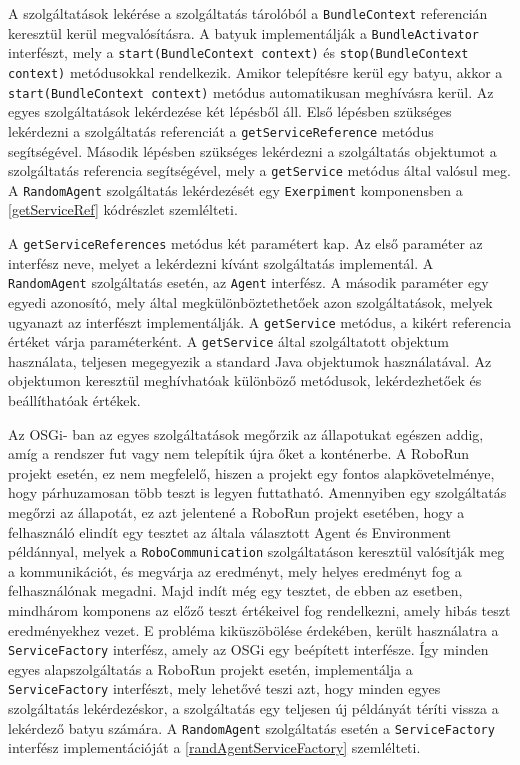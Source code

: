 A szolgáltatások lekérése a szolgáltatás tárolóból a \texttt{BundleContext} referencián keresztül kerül megvalósításra. A batyuk implementálják a \texttt{BundleActivator} interfészt, mely a \texttt{start(BundleContext context)} és \texttt{stop(BundleContext context)} metódusokkal rendelkezik. Amikor telepítésre kerül egy batyu, akkor a \texttt{start(BundleContext context)} metódus automatikusan meghívásra kerül. Az egyes szolgáltatások lekérdezése két lépésből áll. Első lépésben szükséges lekérdezni a szolgáltatás referenciát a \texttt{getServiceReference} metódus segítségével. Második lépésben szükséges lekérdezni a szolgáltatás objektumot a szolgáltatás referencia segítségével, mely a \texttt{getService} metódus által valósul meg. A \texttt{RandomAgent} szolgáltatás lekérdezését egy \texttt{Exerpiment} komponensben a \ref{getServiceRef} kódrészlet szemlélteti. 

%


A \texttt{getServiceReferences} metódus két paramétert kap. Az első paraméter az interfész neve, melyet a lekérdezni kívánt szolgáltatás implementál. A \texttt{RandomAgent} szolgáltatás esetén, az \texttt{Agent} interfész. A második paraméter egy egyedi azonosító, mely által megkülönböztethetőek azon szolgáltatások, melyek ugyanazt az interfészt implementálják. 
A \texttt{getService} metódus, a kikért referencia értéket várja paraméterként. A \texttt{getService} által szolgáltatott objektum használata, teljesen megegyezik a standard Java objektumok használatával. Az objektumon keresztül meghívhatóak különböző metódusok, lekérdezhetőek és beállíthatóak értékek. 

Az OSGi- ban az egyes szolgáltatások megőrzik az állapotukat egészen addig, amíg a rendszer fut vagy nem telepítik újra őket a konténerbe. A RoboRun projekt esetén, ez nem megfelelő, hiszen a projekt egy fontos alapkövetelménye, hogy párhuzamosan több teszt is legyen futtatható. Amennyiben egy szolgáltatás megőrzi az állapotát, ez azt jelentené a RoboRun projekt esetében, hogy a felhasználó elindít egy tesztet az általa választott Agent és Environment példánnyal, melyek a \texttt{RoboCommunication} szolgáltatáson keresztül valósítják meg a kommunikációt, és megvárja az eredményt, mely helyes eredményt fog a felhasználónak megadni. Majd indít még egy tesztet, de ebben az esetben, mindhárom komponens az előző teszt értékeivel fog rendelkezni, amely hibás teszt eredményekhez vezet. E probléma kiküszöbölése érdekében, került használatra a  \texttt{ServiceFactory} interfész, amely az OSGi egy beépített interfésze. Így minden egyes alapszolgáltatás a RoboRun projekt esetén, implementálja a  \texttt{ServiceFactory} interfészt, mely lehetővé teszi azt, hogy minden egyes szolgáltatás lekérdezéskor, a szolgáltatás egy teljesen új példányát téríti vissza a lekérdező batyu számára. A \texttt{RandomAgent} szolgáltatás esetén a \texttt{ServiceFactory} interfész implementációját a \ref{randAgentServiceFactory} szemlélteti.

